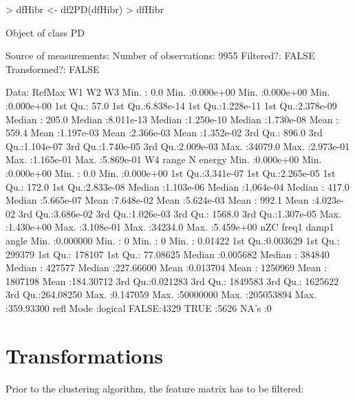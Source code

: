 \documentclass{article}
\renewenvironment{Schunk}{\begin{center}
    \scriptsize
    \begin{boxedminipage}{0.95\textwidth}}{
    \end{boxedminipage}\end{center}}
\begin{document}
\begin{Schunk}
\begin{Sinput}
> dfHibr <- df2PD(dfHibr)
> dfHibr
\end{Sinput}
\begin{Soutput}
Object of class  PD 

Source of measurements:  
Number of observations:  9955 
Filtered?:  FALSE 
Transformed?: FALSE 

Data:
     RefMax              W1                  W2                  W3           
 Min.   :    0.0   Min.   :0.000e+00   Min.   :0.000e+00   Min.   :0.000e+00  
 1st Qu.:   57.0   1st Qu.:6.838e-14   1st Qu.:1.228e-11   1st Qu.:2.378e-09  
 Median :  205.0   Median :8.011e-13   Median :1.250e-10   Median :1.730e-08  
 Mean   :  559.4   Mean   :1.197e-03   Mean   :2.366e-03   Mean   :1.352e-02  
 3rd Qu.:  896.0   3rd Qu.:1.104e-07   3rd Qu.:1.740e-05   3rd Qu.:2.009e-03  
 Max.   :34079.0   Max.   :2.973e-01   Max.   :1.165e-01   Max.   :5.869e-01  
       W4                range                 N               energy         
 Min.   :0.000e+00   Min.   :0.000e+00   Min.   :    0.0   Min.   :0.000e+00  
 1st Qu.:3.341e-07   1st Qu.:2.265e-05   1st Qu.:  172.0   1st Qu.:2.833e-08  
 Median :1.103e-06   Median :1.064e-04   Median :  417.0   Median :5.665e-07  
 Mean   :7.648e-02   Mean   :5.624e-03   Mean   :  992.1   Mean   :4.023e-02  
 3rd Qu.:3.686e-02   3rd Qu.:1.026e-03   3rd Qu.: 1568.0   3rd Qu.:1.307e-05  
 Max.   :1.430e+00   Max.   :3.108e-01   Max.   :34234.0   Max.   :5.459e+00  
      nZC               freq1              damp1               angle          
 Min.   :0.000000   Min.   :       0   Min.   :        0   Min.   :  0.01422  
 1st Qu.:0.003629   1st Qu.:  299379   1st Qu.:   178107   1st Qu.: 77.08625  
 Median :0.005682   Median :  384840   Median :   427577   Median :227.66600  
 Mean   :0.013704   Mean   : 1250969   Mean   :  1807198   Mean   :184.30712  
 3rd Qu.:0.021283   3rd Qu.: 1849583   3rd Qu.:  1625622   3rd Qu.:264.08250  
 Max.   :0.147059   Max.   :50000000   Max.   :205053894   Max.   :359.93300  
    refl        
 Mode :logical  
 FALSE:4329     
 TRUE :5626     
 NA's :0        
\end{Soutput}
\end{Schunk}
\section{Transformations}
\label{sec:transform}

Prior to the clustering algorithm, the feature matrix has to be
filtered:
\end{document}

